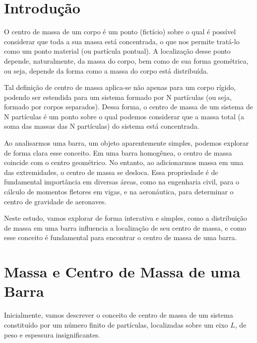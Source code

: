 \documentclass[12pt,a4paper]{report}
\begin{document}
\tableofcontents
\newpage

\listoffigures
\newpage

\chapter*{Introdução}
\begingroup

\setlength{\parskip}{0.2cm}
O centro de massa de um corpo é um ponto (fictício) sobre o qual é possível considerar que toda a sua massa está concentrada, o que nos permite tratá-lo como um ponto material (ou partícula pontual). A localização desse ponto depende, naturalmente, da massa do corpo, bem como de sua forma geométrica, ou seja, depende da forma como a massa do corpo está distribuída.

Tal definição de centro de massa aplica-se não apenas para um corpo rígido, podendo ser estendida para um sistema formado por N partículas (ou seja, formado por corpos separados). Dessa forma, o centro de massa de um sistema de N partículas é um ponto sobre o qual podemos considerar que a massa total (a soma das massas das N partículas) do sistema está concentrada.

Ao analisarmos uma barra, um objeto aparentemente simples, podemos explorar de forma clara esse conceito. Em uma barra homogênea, o centro de massa coincide com o centro geométrico. No entanto, ao adicionarmos massa em uma das extremidades, o centro de massa se desloca. Essa propriedade é de fundamental importância em diversas áreas, como na engenharia civil, para o cálculo de momentos fletores em vigas, e na aeronáutica, para determinar o centro de gravidade de aeronaves.

Neste estudo, vamos explorar de forma interativa e simples, como a distribuição de massa em uma barra influencia a localização de seu centro de massa, e como esse conceito é fundamental para encontrar o centro de massa de uma barra.
\endgroup

\chapter*{Massa e Centro de Massa de uma Barra}

\begingroup
\setlength{\parskip}{0.2cm}
Inicialmente, vamos descrever o conceito de centro de massa de um sistema constituído por um número finito de partículas, localizadas sobre um eixo $L$, de peso e espessura insignificantes.
\end{document}
